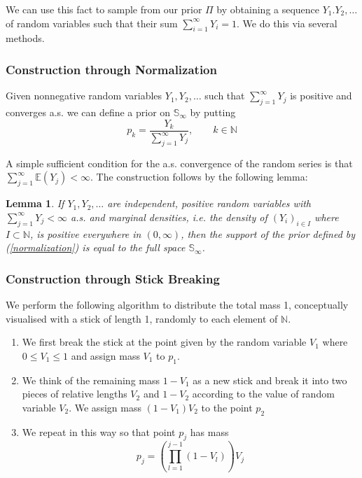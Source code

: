 \documentclass[a4paper,11pt]{article}
\theoremstyle{theorem}
\newtheorem{lem}{Lemma}[section]
\theoremstyle{definition}
\theoremstyle{remark}
\providecommand{\E}{\mathbb{E}}
\begin{document}
We can use this fact to sample from our prior $\Pi$ by obtaining a sequence $Y_1. Y_2, \dotsc$ of random variables such that their sum $\sum_{i=1}^{\infty}{Y_{i}} = 1$. We do this via several methods.

\subsubsection{Construction through Normalization}

Given nonnegative random variables $Y_1, Y_2, \dotsc$ such that $\sum_{j=1}^{\infty}{Y_j}$ is positive and converges a.s. we can define a prior on $\mathbb{S}_{\infty}$ by putting
\begin{equation} \label{normalization}
p_k = \frac{Y_k}{\sum_{j=1}^{\infty}{Y_j}}, \qquad k \in \mathbb{N}
\end{equation}

A simple sufficient condition for the a.s. convergence of the random series is that $\sum_{j=1}^{\infty}{\E (Y_j)} < \infty$. The construction follows by the following lemma:

\begin{lem}
If $Y_1, Y_2, \dotsc$ are independent, positive random variables with $\sum_{j=1}^{\infty}{Y_j} < \infty$ a.s. and marginal densities, i.e. the density of $(Y_i)_{i \in I}$ where $I \subset \mathbb{N}$, is positive everywhere in $(0, \infty)$, then the support of the prior defined by (\ref{normalization}) is equal to the full space $\mathbb{S}_\infty$. 
\end{lem}  

\subsubsection{Construction through Stick Breaking}

We perform the following algorithm to distribute the total mass 1, conceptually visualised with a stick of length 1, randomly to each element of $\mathbb{N}$.
\begin{enumerate}
\item We first break the stick at the point given by the random variable $V_1$ where $0 \leq V_1 \leq 1$ and assign mass $V_1$ to $p_1$.
\item We think of the remaining mass $1 - V_1$ as a new stick and break it into two pieces of relative lengths $V_2$ and $1 - V_2$ according to the value of random variable $V_2$. We assign mass $(1 - V_1)V_2$ to the point $p_2$
\item We repeat in this way so that point $p_j$ has mass
\begin{equation} \label{stickbreak}
p_j = \left(\prod_{l=1}^{j-1}{(1-V_l)}\right)V_j
\end{equation}

\end{enumerate}
\end{document}
